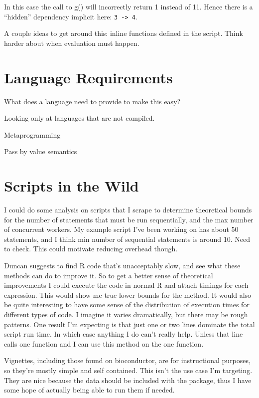 \documentclass[12pt]{article}
\begin{document}
In this case the call to g() will incorrectly return 1 instead of 11.
Hence there is a ``hidden'' dependency implicit here: \texttt{3 -> 4}.

A couple ideas to get around this: inline functions defined in the script.
Think harder about when evaluation must happen.

\section{Language Requirements}

What does a language need to provide to make this easy?

Looking only at languages that are not compiled.

Metaprogramming

Pass by value semantics

\section{Scripts in the Wild}

I could do some analysis on scripts that I scrape to determine theoretical
bounds for the number of statements that must be run sequentially,
and the max number of concurrent workers. My example script I've been
working on has about 50 statements, and I think min number of sequential
statements is around 10. Need to check. This could motivate reducing
overhead though.

Duncan suggests to find R code that's unacceptably slow, and see what these
methods can do to improve it. So to get a better sense of theoretical
improvements I could execute the code in normal R and attach timings for
each expression. This would show me true lower bounds for the method. It
would also be quite interesting to have some sense of the distribution of
execution times for different types of code. I imagine it varies
dramatically, but there may be rough patterns. One result I'm expecting is
that just one or two lines dominate the total script run time. In which
case anything I do can't really help. Unless that line calls one function
and I can use this method on the one function.

Vignettes, including those found on bioconductor, are for instructional
purposes, so they're mostly simple and self contained. This isn't the use
case I'm targeting. They are nice because the data should be included with
the package, thus I have some hope of actually being able to run them if
needed.
\end{document}
